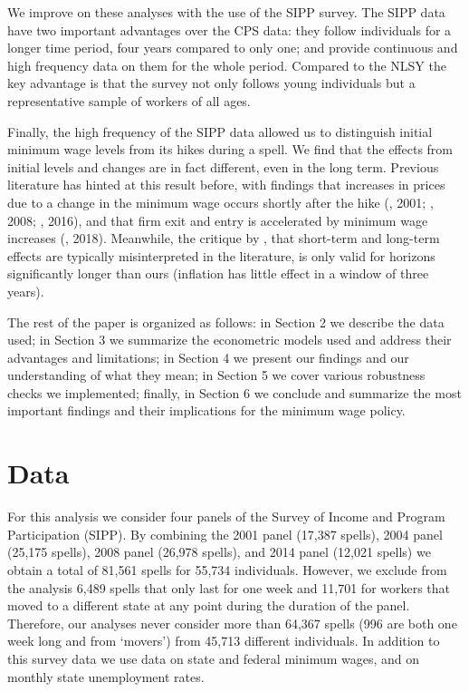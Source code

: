 \documentclass{article}
\begin{document}
We improve on these analyses with the use of the SIPP survey. The SIPP data have two important advantages over the CPS data: they follow individuals for a longer time period, four years compared to only one; and provide continuous and high frequency data on them for the whole period. Compared to the NLSY the key advantage is that the survey not only follows young individuals but a representative sample of workers of all ages. 

Finally, the high frequency of the SIPP data allowed us to distinguish initial minimum wage levels from its hikes during a spell. We find that the effects from initial levels and changes are in fact different, even in the long term. Previous literature has hinted at this result before, with findings that increases in prices due to a change in the minimum wage occurs shortly after the hike (\citeauthor{aaronson2001price}, 2001; \citeauthor{aaronson2008minimum}, 2008; \citeauthor{basker2016does}, 2016), and that firm exit and entry is accelerated by minimum wage increases (\citeauthor{aaronson2018industry}, 2018). Meanwhile, the critique by \cite{sorkin2015there}, that short-term and long-term effects are typically misinterpreted in the literature, is only valid for horizons significantly longer than ours (inflation has little effect in a window of three years).

The rest of the paper is organized as follows: in Section 2 we describe the data used; in Section 3 we summarize the econometric models used and address their advantages and limitations; in Section 4 we present our findings and our understanding of what they mean; in Section 5 we cover various robustness checks we implemented; finally, in Section 6 we conclude and summarize the most important findings and their implications for the minimum wage policy.

\section{Data}

For this analysis we consider four panels of the Survey of Income and Program Participation (SIPP). By combining the 2001 panel (17,387 spells), 2004 panel (25,175 spells), 2008 panel (26,978 spells), and 2014 panel (12,021 spells) we obtain a total of 81,561 spells for 55,734 individuals. However, we exclude from the analysis 6,489 spells that only last for one week and 11,701 for workers that moved to a different state at any point during the duration of the panel. Therefore, our analyses never consider more than 64,367 spells (996 are both one week long and from `movers') from 45,713 different individuals. In addition to this survey data we use data on state and federal minimum wages, and on monthly state unemployment rates.
\end{document}
